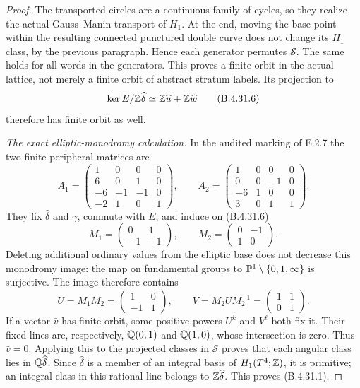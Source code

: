 \begin{proof}
The transported circles are a continuous family of cycles,
so they realize the actual Gauss--Manin transport of $H_1$.
At the end, moving the base point within the resulting
connected punctured double curve does not change its $H_1$
class, by the previous paragraph. Hence each generator
permutes $\mathscr S$. The same holds for all words in the
generators. This proves a finite orbit in the actual lattice,
not merely a finite orbit of abstract stratum labels.
Its projection to
\[
 \ker E/\mathbb Z\widehat\delta
       \simeq \mathbb Z\widehat u+\mathbb Z\widehat w
 \tag{B.4.31.6}
\]
therefore has finite orbit as well.

\emph{The exact elliptic-monodromy calculation.}
In the audited marking of E.2.7 the two finite peripheral
matrices are
\[
 A_1=\begin{pmatrix}
 1&0&0&0\\6&0&1&0\\-6&-1&-1&0\\-2&1&0&1
 \end{pmatrix},\qquad
 A_2=\begin{pmatrix}
 1&0&0&0\\0&0&-1&0\\-6&1&0&0\\3&0&1&1
 \end{pmatrix}.
 \tag{B.4.31.7}
\]
They fix $\widehat\delta$ and $\gamma$, commute with $E$,
and induce on (B.4.31.6)
\[
 M_1=\begin{pmatrix}0&1\\-1&-1\end{pmatrix},\qquad
 M_2=\begin{pmatrix}0&-1\\1&0\end{pmatrix}.
\]
Deleting additional ordinary values from the elliptic base
does not decrease this monodromy image: the map on fundamental
groups to $\mathbb P^1\setminus\{0,1,\infty\}$ is surjective.
The image therefore contains
\[
 U=M_1M_2=\begin{pmatrix}1&0\\-1&1\end{pmatrix},\qquad
 V=M_2UM_2^{-1}=\begin{pmatrix}1&1\\0&1\end{pmatrix}.
 \tag{B.4.31.8}
\]
If a vector $\bar v$ has finite orbit, some positive powers
$U^k$ and $V^\ell$ both fix it. Their fixed lines are,
respectively, $\mathbb Q(0,1)$ and $\mathbb Q(1,0)$, whose intersection
is zero. Thus $\bar v=0$. Applying this to the projected
classes in $\mathscr S$ proves that each angular class lies
in $\mathbb Q\widehat\delta$. Since $\widehat\delta$ is a member
of an integral basis of $H_1(T^4;\mathbb Z)$, it is primitive;
an integral class in this rational line belongs to
$\mathbb Z\widehat\delta$. This proves (B.4.31.1).


\end{proof}
